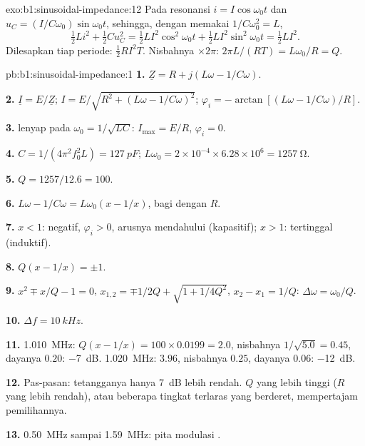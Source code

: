 \begin{solution}{exo:b1:sinusoidal-impedance:12}
Pada resonansi $i = I\cos\omega_0 t$ dan $u_C = (I/C\omega_0)\sin\omega_0 t$,
sehingga, dengan memakai $1/C\omega_0^2 = L$,
\[
\tfrac12 Li^2 + \tfrac12 Cu_C^2 = \tfrac12 LI^2\cos^2\omega_0 t
+ \tfrac12 LI^2\sin^2\omega_0 t = \tfrac12 LI^2 .
\]
Dilesapkan tiap periode: $\tfrac12 RI^2T$. Nisbahnya $\times 2\pi$: $2\pi L/(RT)
= L\omega_0/R = Q$.
\end{solution}

\begin{solution}{pb:b1:sinusoidal-impedance:1}
\textbf{1.} $\underline Z = R + j(L\omega - 1/C\omega)$.

\textbf{2.} $\underline I = E/\underline Z$; $I = E/\sqrt{R^2 + (L\omega -
1/C\omega)^2}$; $\varphi_i = -\arctan[(L\omega - 1/C\omega)/R]$.

\textbf{3.}  lenyap pada $\omega_0 = 1/\sqrt{LC}$: $I_{\max}
= E/R$, $\varphi_i = 0$.

\textbf{4.} $C = 1/(4\pi^2f_0^2L) = \qty{127}{pF}$; $L\omega_0 = 2\times10^{-4}
\times 6.28\times10^6 = \qty{1257}{\ohm}$.

\textbf{5.} $Q = 1257/12.6 = 100$.

\textbf{6.} $L\omega - 1/C\omega = L\omega_0(x - 1/x)$, bagi dengan $R$.

\textbf{7.} $x < 1$:  negatif, $\varphi_i > 0$, arusnya
mendahului (kapasitif); $x > 1$: tertinggal (induktif).

\textbf{8.} $Q(x - 1/x) = \pm1$.

\textbf{9.} $x^2 \mp x/Q - 1 = 0$, $x_{1,2} = \mp1/2Q + \sqrt{1 + 1/4Q^2}$,
$x_2 - x_1 = 1/Q$: $\Delta\omega = \omega_0/Q$.

\textbf{10.} $\Delta f = \qty{10}{kHz}$.

\textbf{11.} \qty{1.010}{MHz}: $Q(x - 1/x) = 100 \times 0.0199 = 2.0$,
nisbahnya $1/\sqrt{5.0} = 0.45$, dayanya $0.20$: \qty{-7}{dB}. \qty{1.020}{MHz}:
$3.96$, nisbahnya $0.25$, dayanya $0.06$: \qty{-12}{dB}.

\textbf{12.} Pas-pasan: tetangganya hanya \qty{7}{dB} lebih rendah. $Q$
yang lebih tinggi ($R$ yang lebih rendah), atau beberapa tingkat
terlaras yang berderet, mempertajam pemilihannya.

\textbf{13.} \qty{0.50}{MHz} sampai \qty{1.59}{MHz}: pita modulasi .


\end{solution}
